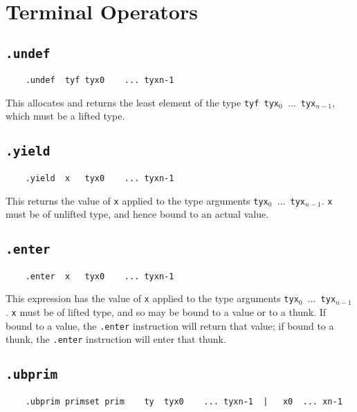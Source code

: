 \documentclass{report}
\newcommand\stringcode[1]{\texttt{#1}}
\begin{document}
\section{Terminal Operators}
\label{terminal_op}

\subsection{\stringcode{.undef}}

\begin{verbatim}
	.undef	tyf	tyx0	...	tyxn-1
\end{verbatim}

This allocates and returns the least element of the type \stringcode{tyf tyx$_0$ $\ldots$ tyx$_{n-1}$}, which must be a lifted type.

\subsection{\stringcode{.yield}}

\begin{verbatim}
	.yield	x	tyx0	...	tyxn-1
\end{verbatim}

This returns the value of \stringcode{x} applied to the type arguments \stringcode{tyx$_0$ $\ldots$ tyx$_{n-1}$}.
\stringcode{x} must be of unlifted type, and hence bound to an actual value.

\subsection{\stringcode{.enter}}

\begin{verbatim}
	.enter	x	tyx0	...	tyxn-1
\end{verbatim}

This expression has the value of \stringcode{x} applied to the type arguments \stringcode{tyx$_0$ $\ldots$ tyx$_{n-1}$}.
\stringcode{x} must be of lifted type, and so may be bound to a value or to a thunk.
If bound to a value, the \stringcode{.enter} instruction will return that value;
if bound to a thunk, the \stringcode{.enter} instruction will enter that thunk.

\subsection{\stringcode{.ubprim}}

\begin{verbatim}
	.ubprim	primset	prim	ty	tyx0	...	tyxn-1	|	x0	...	xn-1
\end{verbatim}
\end{document}
